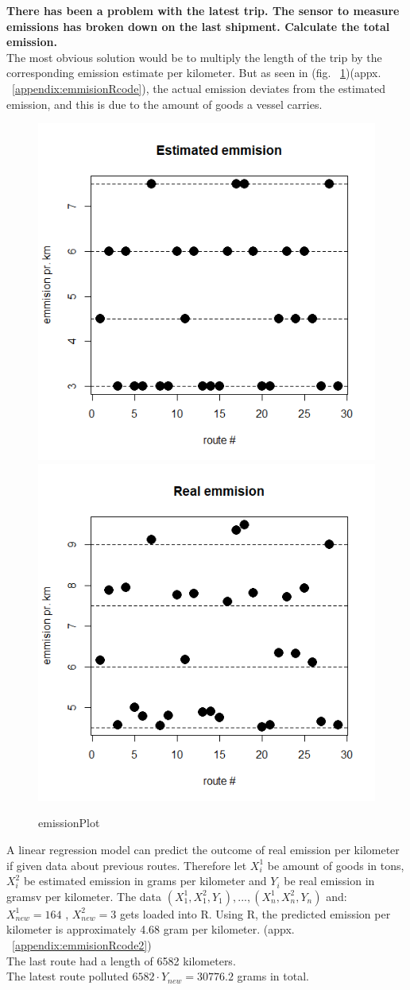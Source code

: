 \documentclass[a4paper]{article}
\begin{document}
\begin{flushleft}
    {\bf There has been a problem with the latest trip. The sensor to measure emissions has broken down on the last shipment. Calculate the total emission.} \\
    The most obvious solution would be to multiply the length of the trip by the corresponding emission estimate per kilometer. But as seen in (fig. ~\ref{fig:EmmisionR})(appx. ~\ref{appendix:emmisionRcode}), the actual emission deviates from the estimated emission, and this is due to the amount of goods a vessel carries.
    \begin{figure} [H]%
        \centering
        {{\includegraphics[width=0.4\linewidth]{assets/estimatedEmmision.png} }}%
        \qquad
        {{\includegraphics[width=0.4\linewidth]{assets/realEmmision.png} }}%
        \caption{emissionPlot}%
        \label{fig:EmmisionR}%
    \end{figure}

    A linear regression model can predict the outcome of real emission per kilometer if given data about previous routes. Therefore let $ X^{1}_{i} $ be amount of goods in tons, $ X^{2}_{i} $ be estimated emission in grams per kilometer and $ Y_i $ be real emission in gramsv per kilometer. The data $ (X^{1}_{1}, X^{2}_{1}, Y_1), ... , (X^{1}_{n}, X^{2}_{n}, Y_n) $ and: \\ $ X^{1}_{new} = 164 $ , $ X^{2}_{new} = 3 $ gets loaded into R. \newline \newline
    Using R, the predicted emission per kilometer is approximately 4.68 gram per kilometer. (appx. ~\ref{appendix:emmisionRcode2}) \\
    The last route had a length of 6582 kilometers. \\
    The latest route polluted $ 6582 \cdot Y_{new} = 30776.2 $ grams in total.
\end{flushleft}
\end{document}
